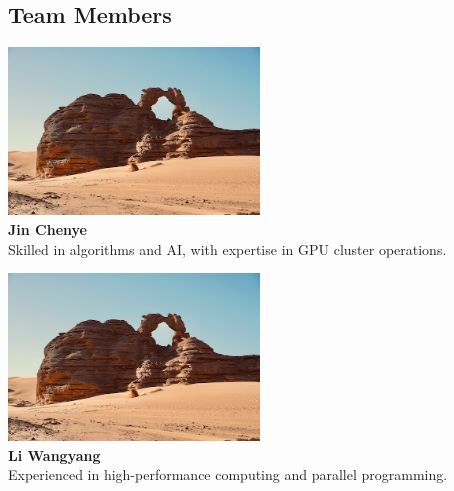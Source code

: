\documentclass[a4paper,12pt]{article}
\begin{document}
\subsection{Team Members}
\begin{table}[H]
\centering
\begin{center}
\begin{minipage}{0.45\textwidth}
    \centering
    \includegraphics[width=0.5\textwidth]{Jin_Chenye.png}\\[0.3cm]
    \textbf{Jin Chenye}\\[0.3cm]
    \small{Skilled in algorithms and AI, with expertise in GPU cluster operations.}
\end{minipage}
\begin{minipage}{0.45\textwidth}
    \centering
    \includegraphics[width=0.5\textwidth]{Li_Wangyang.png}\\[0.3cm]
    \textbf{Li Wangyang}\\[0.3cm]
    \small{Experienced in high-performance computing and parallel programming.}
\end{minipage}

\vspace{1cm}


\end{center}
\end{table}
\end{document}
